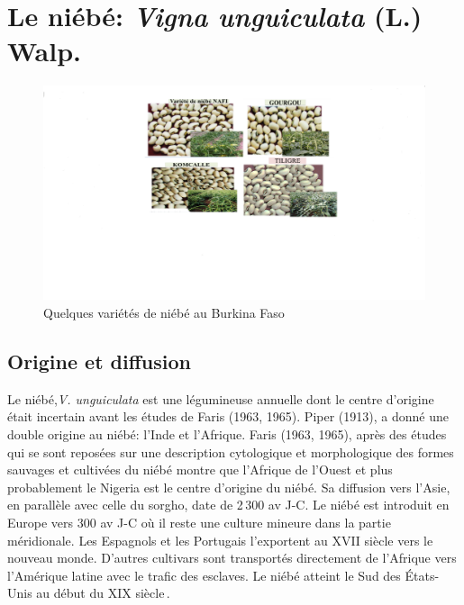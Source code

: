\documentclass[a4paper,11pt]{article}
\begin{document}
      
 

\section{Le niébé: \emph{Vigna unguiculata} (L.) Walp.}
\begin{figure}%
  \begin{center}
   \includegraphics[width=12cm]{images/graines_niebe}
  \end{center}
\caption{Quelques variétés de niébé au Burkina Faso}
\end{figure}

\newpage



\subsection{Origine et diffusion}

Le niébé,\emph{V. unguiculata} est une légumineuse annuelle dont le centre
d’origine était incertain avant les études de Faris (1963,
1965). Piper (1913), a donné une double origine au niébé: l’Inde et
l’Afrique. Faris (1963, 1965), après des études qui se sont reposées
sur une description cytologique et morphologique des formes sauvages
et cultivées du niébé montre que l’Afrique de l’Ouest et plus
probablement le Nigeria est le centre d’origine du niébé. Sa diffusion
vers l’Asie, en parallèle avec celle du sorgho, date de 2\,300 av
J-C. Le niébé est introduit en Europe vers 300 av J-C où il reste une
culture mineure dans la partie méridionale. Les Espagnols et les
Portugais l’exportent au XVII\ieme{} siècle vers le nouveau monde. D’autres
cultivars sont transportés directement de l’Afrique vers l’Amérique
latine avec le trafic des esclaves. Le niébé atteint le Sud des
États-Unis au début du XIX\ieme{} siècle\,\cite{Sawadogo_2009}.
\end{document}
